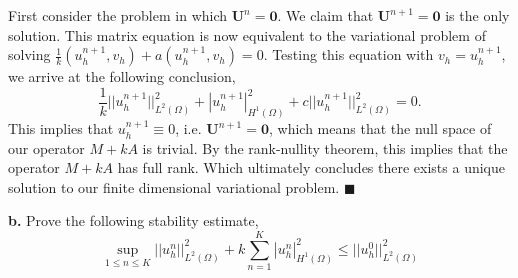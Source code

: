 \documentclass[11pt]{article}
\begin{document}
First consider the problem in which $\mathbf{U}^n = \mathbf{0}$.
We claim that $\mathbf{U}^{n+1} = \mathbf{0}$ is the only solution.
This matrix equation is now equivalent to the variational problem of solving $\frac{1}{k} (u^{n+1}_h, v_h) + a(u^{n+1}_h, v_h) = 0$.
Testing this equation with $v_h = u^{n+1}_h$, we arrive at the following conclusion,
\begin{equation}
	\frac{1}{k} ||u^{n+1}_h||^2_{L^2(\Omega)} + |u^{n+1}_h|^2_{H^1(\Omega)} + c||u^{n+1}_h||^2_{L^2(\Omega)} = 0.
\end{equation}
This implies that $u^{n+1}_h \equiv 0$, i.e. $\mathbf{U}^{n+1} = \mathbf{0}$, which means that the null space of our operator $M + kA$ is trivial. 
By the rank-nullity theorem, this implies that the operator $M + k A$ has full rank.
Which ultimately concludes there exists a unique solution to our finite dimensional variational problem.
$\blacksquare$


\vskip 2cm



\textbf{b.} Prove the following stability estimate,
\begin{equation}
    \sup_{1 \leq n \leq K} ||u^n_h||^2_{L^2(\Omega)} + k \sum_{n = 1}^K |u_h^n|^2_{H^1(\Omega)} \leq ||u^0_h||^2_{L^2(\Omega)}
\end{equation}

\vskip 1cm
\end{document}
